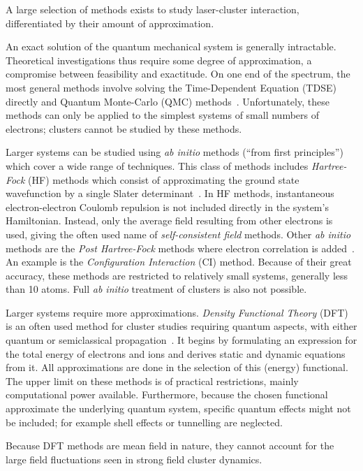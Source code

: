 A large selection of methods exists to study laser-cluster interaction,
differentiated by their amount of approximation.

An exact solution of the quantum mechanical system is generally
intractable. Theoretical investigations thus require some degree of
approximation, a compromise between feasibility and exactitude. On one end of
the spectrum, the most general methods involve solving the
Time-Dependent \schrodinger Equation (TDSE) directly and Quantum Monte-Carlo
(QMC) methods~\cite{Nightingale1998}. Unfortunately, these methods can only be applied to the simplest
systems of small numbers of electrons; clusters cannot be studied by these
methods.

Larger systems can be studied using \textit{ab initio} methods (``from
first principles'') which cover a wide range of techniques. This class of
methods includes \textit{Hartree-Fock} (HF) methods which consist of
approximating the ground state wavefunction by a single Slater
determinant~\cite{Laaksonen1986,Schafer2009}.
In HF methods, instantaneous electron-electron Coulomb repulsion is not
included directly in the system's Hamiltonian. Instead, only the average field
resulting from other electrons is used, giving the often used name of
\textit{self-consistent field} methods. Other \textit{ab
initio} methods are the \textit{Post Hartree-Fock} methods where electron
correlation is added~\cite{Cramer2004}. An example is the \textit{Configuration Interaction} (CI)
method. Because of their great accuracy, these methods are restricted to
relatively small systems, generally less than 10 atoms. Full \textit{ab initio}
treatment of clusters is also not possible.

Larger systems require
more approximations. \textit{Density Functional Theory} (DFT)
is an often used method for cluster studies requiring quantum aspects, with
either quantum or semiclassical propagation~\cite{Schafer2009,Fennel2010}.
It begins by formulating an
expression for the total energy of electrons and ions and derives static and
dynamic equations from it. All approximations are done in the selection of this
(energy) functional. The upper limit on these methods is of practical restrictions,
mainly computational power available. Furthermore, because the chosen
functional approximate the underlying quantum system, specific quantum effects
might not be included; for example shell effects or tunnelling are neglected.

Because DFT methods are mean field in nature, they cannot account for the large
field fluctuations seen in strong field cluster dynamics.

